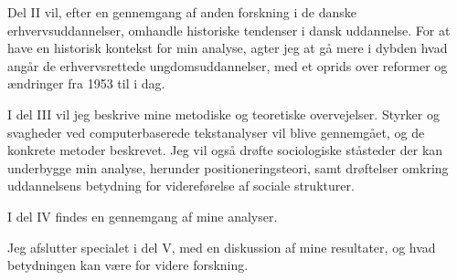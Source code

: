 Del II vil, efter en gennemgang af anden forskning i de danske erhvervsuddannelser, omhandle historiske tendenser i dansk uddannelse.
For at have en historisk kontekst for min analyse, agter jeg at gå mere i dybden hvad angår de erhvervsrettede ungdomsuddannelser, med et oprids over reformer og ændringer fra 1953 til i dag.

I del III vil jeg beskrive mine metodiske og teoretiske overvejelser.
Styrker og svagheder ved computerbaserede tekstanalyser vil blive gennemgået, og de konkrete metoder beskrevet.
Jeg vil også drøfte sociologiske ståsteder der kan underbygge min analyse, herunder positioneringsteori, samt drøftelser omkring uddannelsens betydning for videreførelse af sociale strukturer.

I del IV findes en gennemgang af mine analyser.

Jeg afslutter specialet i del V, med en diskussion af mine resultater, og hvad betydningen kan være for videre forskning.
